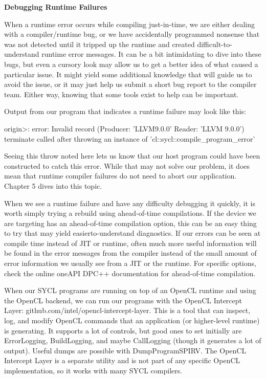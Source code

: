 \hspace*{\fill} \par %
\textbf{Debugging Runtime Failures}

When a runtime error occurs while compiling just-in-time, we are either dealing with a compiler/runtime bug, or we have accidentally programmed nonsense that was not detected until it tripped up the runtime and created difficult-to-understand runtime error messages. It can be a bit intimidating to dive into these bugs, but even a cursory look may allow us to get a better idea of what caused a particular issue. It might yield some additional knowledge that will guide us to avoid the issue, or it may just help us submit a short bug report to the compiler team. Either way, knowing that some tools exist to help can be important.\par

Output from our program that indicates a runtime failure may look like this:\par

\begin{tcolorbox}[colback=white,colframe=black]
origin>: error: Invalid record (Producer: 'LLVM9.0.0' Reader: 'LLVM 9.0.0')\\
terminate called after throwing an instance of 'cl::sycl::compile\_program\_error'

\end{tcolorbox}

Seeing this throw noted here lets us know that our host program could have been constructed to catch this error. While that may not solve our problem, it does mean that runtime compiler failures do not need to abort our application. Chapter 5 dives into this topic.\par

When we see a runtime failure and have any difficulty debugging it quickly, it is worth simply trying a rebuild using ahead-of-time compilations. If the device we are targeting has an ahead-of-time compilation option, this can be an easy thing to try that may yield easierto-understand diagnostics. If our errors can be seen at compile time instead of JIT or runtime, often much more useful information will be found in the error messages from the compiler instead of the small amount of error information we usually see from a JIT or the runtime. For specific options, check the online oneAPI DPC++ documentation for ahead-of-time compilation.\par

When our SYCL programs are running on top of an OpenCL runtime and using the OpenCL backend, we can run our programs with the OpenCL Intercept Layer: github.com/intel/opencl-intercept-layer. This is a tool that can inspect, log, and modify OpenCL commands that an application (or higher-level runtime) is generating. It supports a lot of controls, but good ones to set initially are ErrorLogging, BuildLogging, and maybe CallLogging (though it generates a lot of output). Useful dumps are possible with DumpProgramSPIRV. The OpenCL Intercept Layer is a separate utility and is not part of any specific OpenCL implementation, so it works with many SYCL compilers.\par

